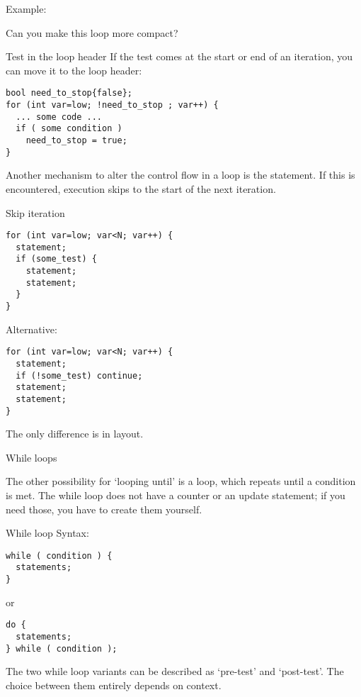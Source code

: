 Example:

\begin{exercise}
  Can you make this loop more compact?
\end{exercise}


\begin{block}{Test in the loop header}
  \label{sl:looptest}
  If the test comes at the start or end of an iteration, you can move it
  to the loop header:
\begin{lstlisting}
bool need_to_stop{false};
for (int var=low; !need_to_stop ; var++) {
  ... some code ...
  if ( some condition )
    need_to_stop = true;
}
\end{lstlisting}
\end{block}

Another mechanism to alter the control flow in a loop is the
 statement. If this is encountered, execution
skips to the start of the next iteration.

\begin{block}{Skip iteration}
  \label{sl:for-cont}
\begin{lstlisting}
for (int var=low; var<N; var++) {
  statement;
  if (some_test) {
    statement;
    statement;
  }
}
\end{lstlisting}
Alternative:
\begin{lstlisting}
for (int var=low; var<N; var++) {
  statement;
  if (!some_test) continue;
  statement;
  statement;
}
\end{lstlisting}
The only difference is in layout.
\end{block}

 {While loops}

The other possibility for `looping until' is a
 loop, which repeats until a condition is met.
The while loop does not have a counter or an update statement; if you
need those, you have to create them yourself.

\begin{block}{While loop}
  \label{sl:while}
  Syntax:
\begin{lstlisting}
while ( condition ) {
  statements;
}
\end{lstlisting}
or
\begin{lstlisting}
do {
  statements;
} while ( condition );
\end{lstlisting}
\end{block}

The two while loop variants can be described as `pre-test' and
`post-test'. The choice between them entirely depends on context.

